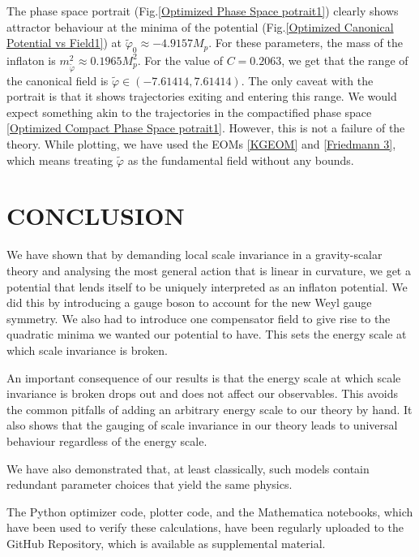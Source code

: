 \documentclass[aps,prd,reprint,preprintnumbers,showpacs,floatfix,nofootinbib,superscript address]{revtex4-2}
\begin{document}
The phase space portrait (Fig.\ref{Optimized Phase Space potrait1}) clearly shows attractor behaviour at the minima of the potential (Fig.\ref{Optimized Canonical Potential vs Field1}) at $\tilde{\varphi}_0 \approx -4.9157 M_p$. For these parameters, the mass of the inflaton is $m_{\tilde{\varphi}}^2 \approx  0.1965 M_p^2$. For the value of $C = 0.2063$, we get that the range of the canonical field is $\tilde{\varphi} \in (-7.61414,7.61414)$. The only caveat with the portrait is that it shows trajectories exiting and entering this range. We would expect something akin to the trajectories in the compactified phase space \ref{Optimized Compact Phase Space potrait1}. However, this is not a failure of the theory. While plotting, we have used the EOMs \ref{KGEOM} and \ref{Friedmann 3}, which means treating $\tilde{\varphi}$ as the fundamental field without any bounds.


\section{CONCLUSION}
We have shown that by demanding local scale invariance in a gravity-scalar theory and analysing the most general action that is linear in curvature, we get a potential that lends itself to be uniquely interpreted as an inflaton potential. We did this by introducing a gauge boson to account for the new Weyl gauge symmetry. We also had to introduce one compensator field to give rise to the quadratic minima we wanted our potential to have. This sets the energy scale at which scale invariance is broken.

An important consequence of our results is that the energy scale at which scale invariance is broken drops out and does not affect our observables. This avoids the common pitfalls of adding an arbitrary energy scale to our theory by hand. It also shows that the gauging of scale invariance in our theory leads to universal behaviour regardless of the energy scale.

We have also demonstrated that, at least classically, such models contain redundant parameter choices that yield the same physics. 

The Python optimizer code, plotter code, and the Mathematica notebooks, which have been used to verify these calculations, have been regularly uploaded to the GitHub Repository, which is available as supplemental material. 

\newpage
\,\,
\newpage

\appendix
\end{document}
